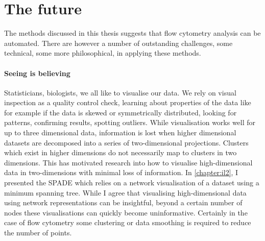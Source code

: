 




\section{ The future }

The methods discussed in this thesis suggests that flow cytometry analysis can be automated.
There are however a number of outstanding challenges, some technical, some more philosophical, in applying these methods.

\paragraph{Seeing is believing}

Statisticians, biologists, we all like to visualise our data.
We rely on visual inspection as a quality control check, learning about properties of the data like for example if the data
is skewed or symmetrically distributed, looking for patterns, confirming results, spotting outliers.
While visualisation works well for up to three dimensional data,
information is lost when higher dimensional datasets are decomposed into a series of two-dimensional projections.
Clusters which exist in higher dimensions do not necessarily map to clusters in two dimensions.
This has motivated research into how to visualise high-dimensional data in two-dimensions with minimal loss of information.
In \cref{chapter:il2}, I presented the SPADE which relies on a network visualisation of a dataset using a minimum spanning tree.
While I agree that visualising high-dimensional data using network representations can be insightful,
beyond a certain number of nodes these visualisations can quickly become uninformative.
Certainly in the case of flow cytometry some clustering or data smoothing is required to reduce the number of points.  


